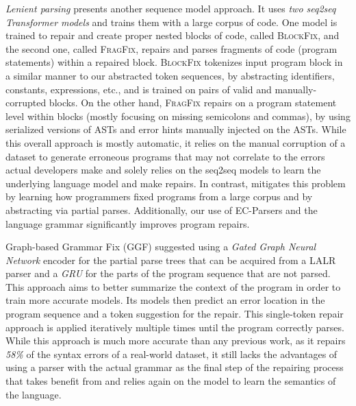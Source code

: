\emph{Lenient parsing} \citep{Ahmed_2021} presents another sequence model
approach. It uses \emph{two seq2seq Transformer models}
and trains them with a large corpus of code. One model is trained to repair and
create proper nested blocks of code, called \textsc{BlockFix}, and the second
one, called \textsc{FragFix}, repairs and parses fragments of code (\eg program
statements) within a repaired block. \textsc{BlockFix} tokenizes input program
block in a similar manner to our abstracted token sequences, by abstracting
identifiers, constants, expressions, etc., and is trained on pairs of valid and manually-corrupted
blocks. On the other hand, \textsc{FragFix} repairs
on a program statement level within blocks (mostly focusing on missing semicolons
and commas), by using serialized versions of ASTs and error hints manually
injected on the ASTs. While this overall approach
is mostly automatic, it relies on the manual corruption of a dataset to generate
erroneous programs that may not correlate to the errors actual developers make
and solely relies on the seq2seq models to learn the underlying language model
and make repairs. In contrast, \toolname mitigates this problem by learning how
programmers fixed programs from a large corpus and by abstracting via
partial parses. Additionally, our use of EC-Parsers and the
language grammar significantly improves program repairs.

%
Graph-based Grammar Fix (\textsc{GGF}) \citep{Wu2020} suggested using a
\emph{Gated Graph Neural Network} encoder for the partial parse trees that can
be acquired from a LALR parser and a \emph{GRU} for the parts of the program
sequence that are not parsed. This approach aims to better summarize the
context of the program in order to train more accurate models. Its models then
predict an error location in the program sequence and a token suggestion for the
repair. This single-token repair approach is applied iteratively multiple times
until the program correctly parses. While this approach is much more accurate
than any previous work, as it repairs \emph{58\%} of the syntax errors of a
real-world dataset, it still lacks the advantages of using a parser with the
actual grammar as the final step of the repairing process that \toolname takes
benefit from and relies again on the model to learn the semantics of the
language.

